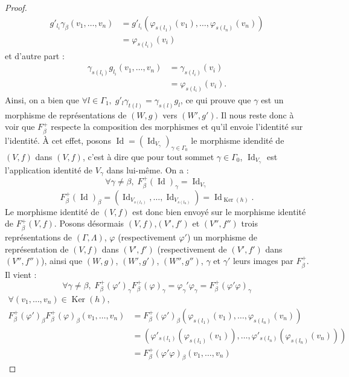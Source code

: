 \documentclass[a4paper,10pt]{article}
\DeclareMathOperator{\Ker}{Ker}
\DeclareMathOperator{\Id}{Id}
\begin{document}
\begin{proof}
\[
\begin{array}{ll}
	g'_{l_{i}}\gamma_{\beta}(v_{1},\dots,v_{n})&=g'_{l_{i}}(\varphi_{s(l_{1})}(v_{1}),\dots,\varphi_{s(l_{n})}(v_{n}))\\
	&=\varphi_{s(l_{i})}(v_{i})
\end{array}
\]
et d'autre part :
\[
\begin{array}{ll}
	\gamma_{s(l_{i})}g_{l_{i}}(v_{1},\dots,v_{n})&=\gamma_{s(l_{i})}(v_{i})\\
	&=\varphi_{s(l_{i})}(v_{i}).
\end{array}
\]
Ainsi, on a bien que $\forall l \in\Gamma_{1},\;g'_{l}\gamma_{t(l)}=\gamma_{s(l)}g_{l}$, ce qui prouve que $\gamma$ est un morphisme de représentations de $(W,g)$ vers $(W',g')$. Il nous reste donc à voir que $F_{\beta}^{+}$ respecte la composition des morphismes et qu'il envoie l'identité sur l'identité. À cet effet, posons $\Id = (\Id_{V_{\gamma}})_{\gamma\in\Gamma_{0}}$ le morphisme idendité de $(V,f)$ dans $(V,f)$, c'est à dire que pour tout sommet $\gamma\in\Gamma_{0}$, $\Id_{V_{\gamma}}$ est l'application identité de $V_{\gamma}$ dans lui-même. On a :
\[
	\forall \gamma\neq\beta,\;F_{\beta}^{+}(\Id)_{\gamma}=\Id_{V_{\gamma}}
\]
\[
	F_{\beta}^{+}(\Id)_{\beta}=(\Id_{V_{s(l_{1})}},\dots,\Id_{V_{s(l_{n})}})=\Id_{\Ker(h)}.
\]
Le morphisme identité de $(V,f)$ est donc bien envoyé sur le morphisme identité de $F_{\beta}^{+}(V,f)$. Posons désormais $(V,f)$,$(V',f')$ et $(V'',f'')$ trois représentations de $(\Gamma,\Lambda)$, $\varphi$ (respectivement $\varphi '$) un morphisme de représentation de $(V,f)$ dans $(V',f')$ (respectivement de $(V',f')$ dans $(V'',f'')$), ainsi que $(W,g)$, $(W',g')$, $(W'',g'')$, 
 $\gamma$ et $\gamma '$ leurs images par $F_{\beta}^{+}$. Il vient :
\[
	\forall \gamma\neq\beta,\;F_{\beta}^{+}(\varphi')_{\gamma}F_{\beta}^{+}(\varphi)_{\gamma}=\varphi_{\gamma}'\varphi_{\gamma}=F_{\beta}^{+}(\varphi'\varphi)_{\gamma}
\]
\[
	\begin{array}{ll}
		\forall (v_{1},\dots,v_{n})\in\Ker(h),& \\
		F_{\beta}^{+}(\varphi')_{\beta}F_{\beta}^{+}(\varphi)_{\beta}(v_{1},\dots,v_{n})&=F_{\beta}^{+}(\varphi')_{\beta}(\varphi_{s(l_{1})}(v_{1}),\dots,\varphi_{s(l_{n})}(v_{n}))\\
		&=(\varphi'_{s(l_{1})}(\varphi_{s(l_{1})}(v_{1})),\dots,\varphi'_{s(l_{n})}(\varphi_{s(l_{n})}(v_{n})))\\
		&=F_{\beta}^{+}(\varphi'\varphi)_{\beta}(v_{1},\dots,v_{n})


\end{array}\]
\end{proof}
\end{document}
